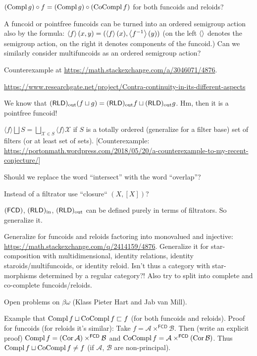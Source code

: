 \documentclass{amsart}
\begin{document}
$(\operatorname{Compl} g)\circ f=(\operatorname{Compl} g)\circ(\operatorname{CoCompl} f)$ for both funcoids and reloids?

A funcoid or pointfree funcoids can be turned into an ordered semigroup action also by the formula: $\left\langle f\right\rangle(x,y)=(\left\langle f\right\rangle(x),\left\langle f^{-1}\right\rangle(y))$ (on the left $\left\langle \right\rangle$ denotes the semigroup action, on the right it denotes components of the funcoid.) Can we similarly consider multifuncoids as an ordered semigroup action?

Counterexample at \url{https://math.stackexchange.com/a/3046071/4876}.

\url{https://www.researchgate.net/project/Contra-continuity-in-its-different-aspects}

We know that $(\mathsf{RLD})_{\mathrm{out}}(f\sqcup g) = (\mathsf{RLD})_{\mathrm{out}} f\sqcup(\mathsf{RLD})_{\mathrm{out}} g$.
Hm, then it is a pointfree funcoid!

\begin{conjecture}
$\langle f \rangle \bigsqcup S = \bigsqcup_{\mathcal{X} \in S} \langle f
\rangle \mathcal{X}$ if $S$ is a totally ordered (generalize for a filter
base) set of filters (or at least set of sets).
[Counterexample: \url{https://portonmath.wordpress.com/2018/05/20/a-counterexample-to-my-recent-conjecture/}]
\end{conjecture}

Should we replace the word ``intersect'' with the word ``overlap''?

Instead of a filtrator use ``closure`` $(X,[X])$?

$(\mathsf{FCD})$, $(\mathsf{RLD})_{\mathrm{in}}$, $(\mathsf{RLD})_{\mathrm{out}}$ can be defined purely in terms of filtrators.
So generalize it.

Generalize for funcoids and reloids factoring into monovalued and injective:\\
\url{https://math.stackexchange.com/q/2414159/4876}.
Generalize it for star-composition with multidimensional, identity relations, identity staroids/multifuncoids, or identity reloid.
Isn't thus a category with star-morphisms determined by a regular category?!
Also try to split into complete and co-complete funcoids/reloids.

Open problems on $\beta\omega$ (Klass Pieter Hart and Jab van Mill).

Example that $\operatorname{Compl} f\sqcup\operatorname{CoCompl} f\sqsubset f$ (for both funcoids and reloids).
Proof for funcoids (for reloids it's similar): Take $f=\mathcal{A}\times^{\mathsf{FCD}}\mathcal{B}$. Then (write an explicit proof)
$\operatorname{Compl} f=(\operatorname{Cor}\mathcal{A})\times^{\mathsf{FCD}}\mathcal{B}$ and $\operatorname{CoCompl} f=\mathcal{A}\times^{\mathsf{FCD}}(\operatorname{Cor}\mathcal{B})$.
Thus $\operatorname{Compl} f\sqcup\operatorname{CoCompl} f\ne f$ (if $\mathcal{A}$, $\mathcal{B}$ are non-principal).
\end{document}
